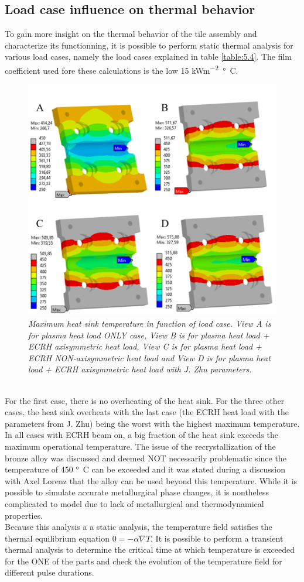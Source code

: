 \subsection{Load case influence on thermal behavior} \label{Load case influence on thermal behavior}
\normalsize{To gain more insight on the thermal behavior of the tile assembly and characterize its functionning, it is possible to perform static thermal analysis for various load cases, namely the load cases explained in table \ref{table:5.4}. The film coefficient used fore these calculations is the low 15 \unit{kWm^{-2}\si{\degree}C}. }
\\
\begin{figure}[h!]
    \label{fig_5_10} 
    \centering
    \includegraphics[width=.7\textwidth]{figures/loadcasestaticthermalHSTF.png}
    \caption{\it Maximum heat sink temperature in function of load case. View A is for plasma heat load ONLY case, View B is for plasma heat load + ECRH axisymmetric heat load, View C is for plasma heat load + ECRH NON-axisymmetric heat load  and View D is for plasma heat load + ECRH axisymmetric heat load with J. Zhu parameters.}
\end{figure}
\\
\normalsize{\indent For the first case, there is no overheating of the heat sink. For the three other cases, the heat sink overheats with the last case (the ECRH heat load with the parameters from J. Zhu) being the worst with the highest maximum temperature. In all cases with ECRH beam on, a big fraction of the heat sink exceeds the maximum operational temperature. The issue of the recrystallization of the bronze alloy was discussed and deemed NOT necessarily problematic since the temperature of 450 \unit{\si{\degree}C} can be exceeded and it was stated during a discussion with Axel Lorenz that the alloy can be used beyond this temperature. While it is possible to simulate accurate metallurgical phase changes, it is nontheless complicated to model due to lack of metallurgical and thermodynamical properties.}
\\
\break
\normalsize{\indent Because this analysis a a static analysis, the temperature field satisfies the thermal equilibrium equation $0=-\alpha \nabla T$. It is possible to perform a transient thermal analysis to determine the critical time at which temperature is exceeded for the ONE of the parts and check the evolution of the temperature field for different pulse durations.}